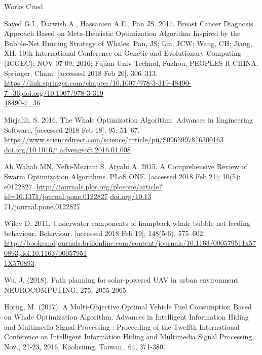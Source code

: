 \documentclass[11pt]{article}
\newcommand{\bibent}{\noindent \hangindent 40pt}
\newenvironment{workscited}{\newpage \begin{center} Works Cited \end{center}}{\newpage }
\begin{document}
\begin{workscited}

\bibent
Sayed G.I., Darwish A., Hassanien A.E., Pan JS. 2017. Breast Cancer Diagnosis Approach Based on Meta-Heuristic Optimization Algorithm Inspired by the Bubble-Net Hunting Strategy of Whales. Pan, JS; Lin, JCW; Wang, CH; Jiang, XH. 10th International Conference on Genetic and Evolutionary Computing (ICGEC); NOV 07-09, 2016; Fujian Univ Technol, Fuzhou, PEOPLES R CHINA. Springer, Cham; [accessed 2018 Feb 20]. 306--313. \url{https://link.springer.com/chapter/10.1007/978-3-319-48490-7_36}.\url{doi.org/10.1007/978-3-319}\\\url{48490-7_36}

\bibent
Mirjalili, S. 2016. The Whale Optimization Algorithm. Advances in Engineering Software. [accessed 2018 Feb 18]; 95: 51--67. \url{https://www.sciencedirect.com/science/article/pii/S0965997816300163} \url{doi.org/10.1016/j.advengsoft.2016.01.008}

\bibent
Ab Wahab MN, Nefti-Meziani S, Atyabi A. 2015. A Comprehensive Review of Swarm Optimization Algorithms. PLoS ONE. [accessed 2018 Feb 21]; 10(5): e0122827. \url{http://journals.plos.org/plosone/article?id=10.1371/journal.pone.0122827} \url{doi.org/10.13}\\\url{71/journal.pone.0122827}

\bibent
Wiley D. 2011. Underwater components of humpback whale bubble-net feeding behaviour. Behaviour. [accessed 2018 Feb 19]; 148(5-6), 575--602. \url{http://booksandjournals.brillonline.com/content/journals/10.1163/000579511x570893}.\url{doi.10.1163/00057951}\\\url{1X570893}.


%
%
\bibent
Wu, J. (2018). Path planning for solar-powered UAV in urban environment. NEUROCOMPUTING, 275, 2055-2065.

\bibent
Horng, M. (2017). A Multi-Objective Optimal Vehicle Fuel Consumption Based on Whale Optimization Algorithm. Advances in Intelligent Information Hiding and Multimedia Signal Processing : Proceeding of the Twelfth International Conference on Intelligent Information Hiding and Multimedia Signal Processing, Nov., 21-23, 2016, Kaohsiung, Taiwan., 64, 371-380.

\end{workscited}
\end{document}
